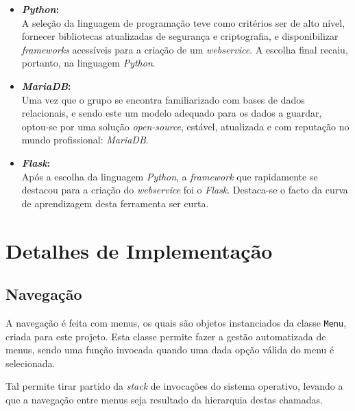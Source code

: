 \begin{itemize}
    \item \textbf{\textit{Python}:}\\
        A seleção da linguagem de programação teve como critérios ser de alto nível, fornecer bibliotecas atualizadas de segurança e criptografia, e disponibilizar \textit{frameworks} acessíveis para a criação de um \textit{webservice}. A escolha final recaiu, portanto, na linguagem \textit{Python}.
    
    \item \textbf{\textit{MariaDB}:}\\
        Uma vez que o grupo se encontra familiarizado com bases de dados relacionais, e sendo este um modelo adequado para os dados a guardar, optou-se por uma solução \textit{open-source}, estável, atualizada e com reputação no mundo profissional: \textit{MariaDB}.
    
    \item \textbf{\textit{Flask}:}\\
        Após a escolha da linguagem \textit{Python}, a \textit{framework} que rapidamente se destacou para a criação do \textit{webservice} foi o \textit{Flask}. Destaca-se o facto da curva de aprendizagem desta ferramenta ser curta.
\end{itemize}


\section{Detalhes de Implementação}
\label{sec::implementacao:detalhes}



\subsection{Navegação}
\label{ssec::implementacao:detalhes:nav}

A navegação é feita com menus, os quais são objetos instanciados da classe \verb|Menu|, criada para este projeto. Esta classe permite fazer a gestão automatizada de menus, sendo uma função invocada quando uma dada opção válida do menu é selecionada.

Tal permite tirar partido da \textit{stack} de invocações do sistema operativo, levando a que a navegação entre menus seja resultado da hierarquia destas chamadas.


